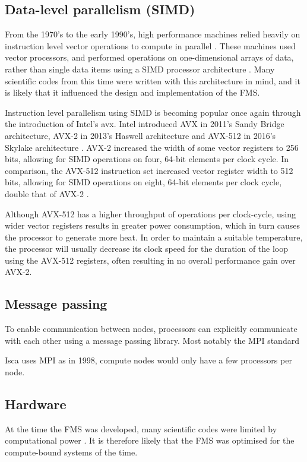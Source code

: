 \documentclass[a4paper,11pt]{report}
\begin{document}
\subsection{Data-level parallelism (SIMD)}
From the 1970's to the early 1990's, high performance machines relied heavily on instruction level vector operations to compute in parallel \cite{6877473}. These machines used vector processors, and performed operations on one-dimensional arrays of data, rather than single data items using a SIMD processor architecture \cite{conte2000long}. Many scientific codes from this time were written with this architecture in mind, and it is likely that it influenced the design and implementation of the FMS. 
\par
Instruction level parallelism using SIMD is becoming popular once again through the introduction of Intel's \gls{avx}. Intel introduced AVX in 2011's Sandy Bridge architecture, AVX-2 in 2013's Haswell architecture and AVX-512 in 2016's Skylake architecture \cite{chris2011avx, intel2019avx}. AVX-2 increased the width of some vector registers to 256 bits, allowing for SIMD operations on four, 64-bit elements per clock cycle. In comparison, the AVX-512 instruction set increased vector register width to 512 bits, allowing for SIMD operations on eight, 64-bit elements per clock cycle, double that of AVX-2 \cite{chris2011avx,xeon2680v4}.
\par
Although AVX-512 has a higher throughput of operations per clock-cycle, using wider vector registers results in greater power consumption, which in turn causes the processor to generate more heat. In order to maintain a suitable temperature, the processor will usually decrease its clock speed for the duration of the loop using the AVX-512 registers, often resulting in no overall performance gain over AVX-2.


\subsection{Message passing}
To enable communication between nodes, processors can explicitly communicate with each other using a message passing library. Most notably the MPI standard

Isca uses MPI as in 1998, compute nodes would only have a few processors per node. 

\subsection{Hardware}
At the time the FMS was developed, many scientific codes were limited by computational power \cite{mccalpin1995memory}. It is therefore likely that the FMS was optimised for the compute-bound systems of the time. 
\end{document}
